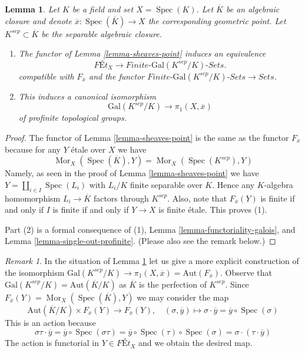 \documentclass{stacks-project}
\theoremstyle{plain}
\newtheorem{lemma}[subsection]{Lemma}
\theoremstyle{definition}
\theoremstyle{remark}
\newtheorem{remark}[subsection]{Remark}
\numberwithin{equation}{subsection}
\def\Spec{\mathop{\mathrm{Spec}}}
\def\Mor{\mathop{\mathrm{Mor}}\nolimits}
\begin{document}
\begin{lemma}
\label{lemma-fundamental-group-Galois-group}
Let $K$ be a field and set $X = \Spec(K)$. Let $\overline{K}$ be an
algebraic closure and denote $\overline{x} : \Spec(\overline{K}) \to X$
the corresponding geometric point. Let $K^{sep} \subset \overline{K}$
be the separable algebraic closure.
\begin{enumerate}
\item The functor of Lemma \ref{lemma-sheaves-point} induces an equivalence
$$
\textit{F\'Et}_X \longrightarrow
\textit{Finite-}\text{Gal}(K^{sep}/K)\textit{-Sets}.
$$
compatible with $F_{\overline{x}}$ and the functor
$\textit{Finite-}\text{Gal}(K^{sep}/K)\textit{-Sets} \to \textit{Sets}$.
\item This induces a canonical isomorphism
$$
\text{Gal}(K^{sep}/K) \longrightarrow \pi_1(X, \overline{x})
$$
of profinite topological groups.
\end{enumerate}
\end{lemma}

\begin{proof}
The functor of Lemma \ref{lemma-sheaves-point} is the same as the functor
$F_{\overline{x}}$ because for any $Y$ \'etale over $X$ we have
$$
\Mor_X(\Spec(\overline{K}), Y) = \Mor_X(\Spec(K^{sep}), Y)
$$
Namely, as seen in the proof of Lemma \ref{lemma-sheaves-point} we have
$Y = \coprod_{i \in I} \Spec(L_i)$ with $L_i/K$ finite separable over $K$.
Hence any $K$-algebra homomorphism $L_i \to \overline{K}$ factors
through $K^{sep}$. Also, note that $F_{\overline{x}}(Y)$ is finite
if and only if $I$ is finite if and only if $Y \to X$ is finite \'etale.
This proves (1).

\medskip\noindent
Part (2) is a formal consequence of (1),
Lemma \ref{lemma-functoriality-galois}, and
Lemma \ref{lemma-single-out-profinite}.
(Please also see the remark below.)
\end{proof}

\begin{remark}
\label{remark-variance}
In the situation of Lemma \ref{lemma-fundamental-group-Galois-group}
let us give a more explicit construction of the isomorphism
$\text{Gal}(K^{sep}/K) \to
\pi_1(X, \overline{x}) = \text{Aut}(F_{\overline{x}})$.
Observe that
$\text{Gal}(K^{sep}/K) = \text{Aut}(\overline{K}/K)$
as $\overline{K}$ is the perfection of $K^{sep}$.
Since $F_{\overline{x}}(Y) = \Mor_X(\Spec(\overline{K}), Y)$
we may consider the map
$$
\text{Aut}(\overline{K}/K) \times F_{\overline{x}}(Y) \to F_{\overline{x}}(Y),
\quad
(\sigma, \overline{y}) \mapsto
\sigma \cdot \overline{y} = \overline{y} \circ \Spec(\sigma)
$$
This is an action because
$$
\sigma\tau \cdot \overline{y} =
\overline{y} \circ \Spec(\sigma\tau) =
\overline{y} \circ \Spec(\tau) \circ \Spec(\sigma) =
\sigma \cdot (\tau \cdot \overline{y})
$$
The action is functorial in $Y \in \textit{F\'Et}_X$ and we
obtain the desired map.
\end{remark}
\end{document}
